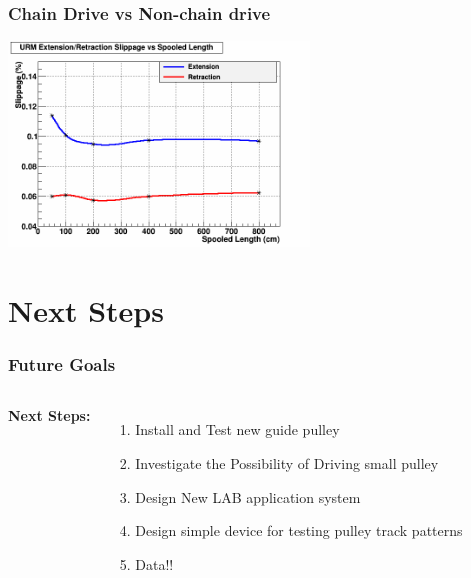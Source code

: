 \documentclass{beamer}
\begin{document}
\begin{frame}
\frametitle{Chain Drive vs Non-chain drive}
\centering\includegraphics[width=8cm]{spooled.png}
\end{frame}
\section{Next Steps}

\begin{frame}
\frametitle{Future Goals}
\begin{columns}[t] %

\textbf{Next Steps:}
\begin{enumerate}
\item Install and Test new guide pulley
\item Investigate the Possibility of Driving small pulley
\item Design New LAB application system
\item Design simple device for testing pulley track patterns
\item Data!!
\end{enumerate}



\end{columns}

\end{frame}

\end{document}
